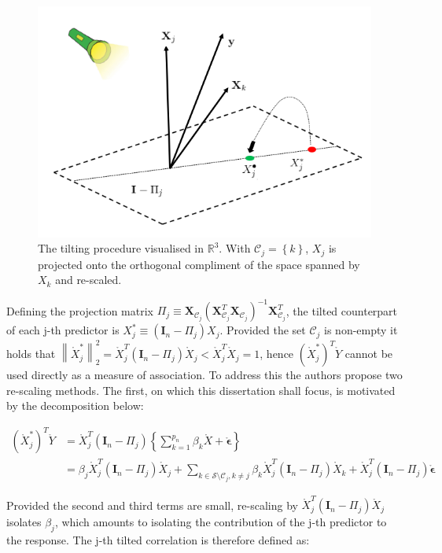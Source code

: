 \documentclass[11pt]{report}\usepackage[utf8]{inputenc}
\begin{document}
\begin{figure}[h]
    \centering
    \includegraphics[width = 0.5\linewidth]{../plots/Tilting intuition.png}
        \caption{The tilting procedure visualised in $\mathbb{R}^3$. With $\mathcal{C}_j = \left \{ k \right \}$, $X_j$ is projected onto the orthogonal compliment of the space spanned by $X_k$ and re-scaled.}
    \label{graphical tilt}
\end{figure}

Defining the projection matrix $\Pi_j \equiv \boldsymbol{X}_{\mathcal{C}_j} \left ( \boldsymbol{X}_{\mathcal{C}_j}^T \boldsymbol{X}_{\mathcal{C}_j} \right )^{-1}\boldsymbol{X}_{\mathcal{C}_j}^T$, the tilted counterpart of each j-th predictor is $X_j^* \equiv  \left ( \boldsymbol{I}_n - \Pi_j \right )X_j$. Provided the set $\mathcal{C}_j$ is non-empty it holds that $\left \| \mathring{X}_j^* \right \|_2^2 = \mathring{X}_j^T\left ( \boldsymbol{I}_n - \Pi_j \right ) \mathring{X}_j < \mathring{X}_j^T\mathring{X}_j = 1 $, hence $\left ( \mathring{X}_j^* \right )^T \mathring{Y}$ cannot be used directly as a measure of association. To address this the authors propose two re-scaling methods. The first, on which this dissertation shall focus, is motivated by the decomposition below: 

\begin{align*}
    \left ( \mathring{X}_j^* \right )^T\mathring{Y} & = \mathring{X}_j^T \left ( \boldsymbol{I}_n -\Pi_j \right )\left \{ \sum_{k=1}^{p_n} \beta_k \mathring{X} + \mathring{\boldsymbol{\epsilon}} \right \} \\
    & = \beta_j\mathring{X}_j^T\left ( \boldsymbol{I}_n - \Pi_j \right )\mathring{X}_j + \sum_{k \in \mathcal{S} \setminus \mathcal{C}_j,k\neq j}\beta_k\mathring{X}_j^T\left ( \boldsymbol{I}_n - \Pi_j \right )\mathring{X}_k + \mathring{X}_j^T\left ( \boldsymbol{I}_n - \Pi_j \right )\mathring{\boldsymbol{\epsilon}}
\end{align*}

Provided the second and third terms are small, re-scaling by $\mathring{X}_j^T (\boldsymbol{I}_n-\Pi_j) \mathring{X}_j$ isolates $\beta_j$, which amounts to isolating the contribution of the j-th predictor to the response. The j-th tilted correlation is therefore defined as: 
\end{document}
